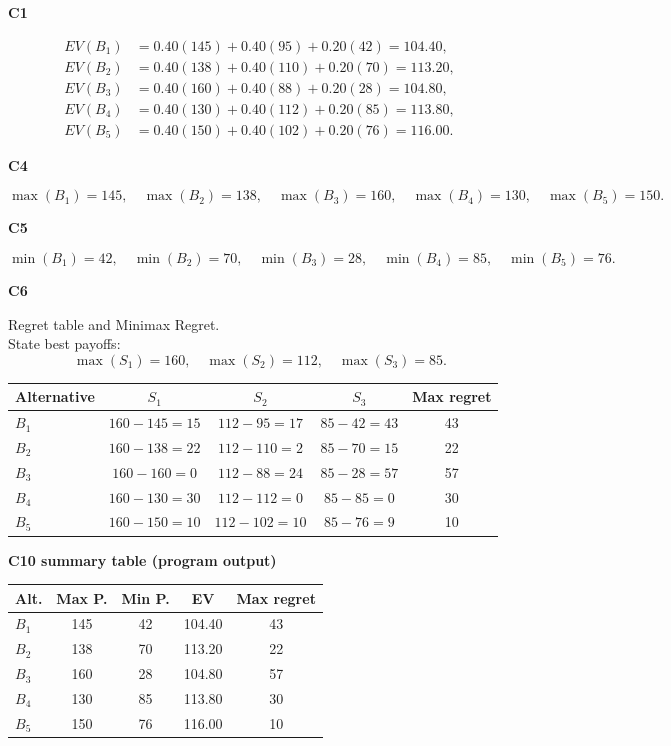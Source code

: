 \begin{ExamProblems}
		\textbf{C1}\par
				\[
		\begin{aligned}
			EV(B_1)&=0.40(145)+0.40(95)+0.20(42)=104.40,\\
			EV(B_2)&=0.40(138)+0.40(110)+0.20(70)=113.20,\\
			EV(B_3)&=0.40(160)+0.40(88)+0.20(28)=104.80,\\
			EV(B_4)&=0.40(130)+0.40(112)+0.20(85)=113.80,\\
			EV(B_5)&=0.40(150)+0.40(102)+0.20(76)=116.00.
		\end{aligned}
		\]
		

		\textbf{C4}\par
				\[
		\max(B_1)=145,\quad \max(B_2)=138,\quad \max(B_3)=160,\quad \max(B_4)=130,\quad \max(B_5)=150.
		\]
		

		\textbf{C5}\par
				\[
		\min(B_1)=42,\quad \min(B_2)=70,\quad \min(B_3)=28,\quad \min(B_4)=85,\quad \min(B_5)=76.
		\]

		\textbf{C6}\par
		Regret table and Minimax Regret.\\
				State best payoffs:
		\[
		\max(S_1)=160,\quad \max(S_2)=112,\quad \max(S_3)=85.
		\]
		\begin{center}
			\begin{tabular}{l c c c c}
				\toprule
				Alternative & $S_1$ & $S_2$ & $S_3$ & Max regret \\
				\midrule
				$B_1$ & $160-145=15$ & $112-95=17$ & $85-42=43$ & 43 \\
				$B_2$ & $160-138=22$ & $112-110=2$ & $85-70=15$ & 22 \\
				$B_3$ & $160-160=0$ & $112-88=24$ & $85-28=57$ & 57 \\
				$B_4$ & $160-130=30$ & $112-112=0$ & $85-85=0$ & 30 \\
				$B_5$ & $160-150=10$ & $112-102=10$ & $85-76=9$ & 10 \\
				\bottomrule
			\end{tabular}
		\end{center}
		

		\textbf{C10 summary table (program output)}\par
		\begin{center}
			\begin{tabular}{l c c c c}
				\hline
				Alt. & Max P. & Min P. & EV & Max regret \\
				\hline
				$B_1$ & 145 & 42 & 104.40 & 43 \\
				$B_2$ & 138 & 70 & 113.20 & 22 \\
				$B_3$ & 160 & 28 & 104.80 & 57 \\
				$B_4$ & 130 & 85 & 113.80 & 30 \\
				$B_5$ & 150 & 76 & 116.00 & 10 \\
				\hline
			\end{tabular}
		\end{center}
		

\end{ExamProblems}

